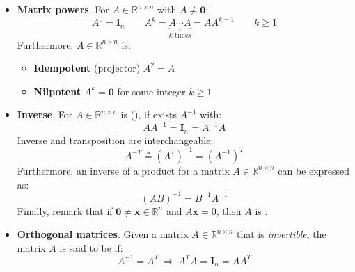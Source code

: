 \begin{itemize}
	\item \textbf{Matrix powers}. For $A \in \mathbb{R}^{n \times n}$ with $A \ne \mathbf{0}$:
	\begin{equation*}
		A^{0} = \mathbf{I}_{n} \hspace{2em} A^{k} = \underbrace{A \cdots A}_{k\text{ times}} = AA^{k-1} \hspace{2em} k \ge 1
	\end{equation*}
	Furthermore, $A \in \mathbb{R}^{n \times n}$ is:
	\begin{itemize}
		\item \textbf{Idempotent} (projector) $A^{2} = A$ 
		\item \textbf{Nilpotent} $A^{k} = \mathbf{0}$ for some integer $k \ge 1$ 
	\end{itemize}
	
	\item \textbf{Inverse}. For $A \in \mathbb{R}^{n \times n}$ is  (), if exists $A^{-1}$ with:
	\begin{equation}\label{eq: nonsingular matrix}
		AA^{-1} = \mathbf{I}_{n} = A^{-1}A
	\end{equation}
	Inverse and transposition are interchangeable:
	\begin{equation*}
		A^{-T} \triangleq \left(A^{T}\right)^{-1} = \left(A^{-1}\right)^{T}
	\end{equation*}
	Furthermore, an inverse of a product for a matrix $A \in \mathbb{R}^{n \times n}$ can be expressed as:
	\begin{equation*}
		\left(AB\right)^{-1} = B^{-1}A^{-1}
	\end{equation*}
	Finally, remark that if $\mathbf{0} \ne \mathbf{x} \in \mathbb{R}^{n}$ and $A\mathbf{x} = 0$, then $A$ is .
	
	\item \textbf{Orthogonal matrices}. Given a matrix $A \in \mathbb{R}^{n \times n}$ that is \emph{invertible}, the matrix $A$ is said to be  if:
	\begin{equation*}
		A^{-1} = A^{T} \: \Rightarrow \: A^{T}A = \mathbf{I}_{n} = AA^{T}
	\end{equation*}
	

\end{itemize}
